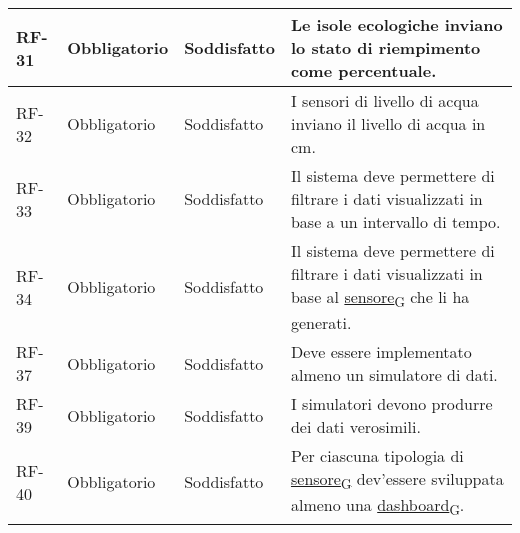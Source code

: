 \begin{longtable}{|>{\centering\arraybackslash}m{}|>{\centering\arraybackslash}m{}|>{\centering\arraybackslash}m{}|>{\centering\arraybackslash}m{}|}
	\\\hline
	RF-31           & Obbligatorio        & Soddisfatto & Le isole ecologiche inviano lo stato di riempimento come percentuale.
	\\\hline
	RF-32           & Obbligatorio        & Soddisfatto & I sensori di livello di acqua inviano il livello di acqua in cm.
	\\\hline
	RF-33           & Obbligatorio        & Soddisfatto & Il sistema deve permettere di filtrare i dati visualizzati in base a un intervallo di tempo.
	\\\hline
	RF-34           & Obbligatorio        & Soddisfatto & Il sistema deve permettere di filtrare i dati visualizzati in base al \href{https://7last.github.io/docs/rtb/documentazione-interna/glossario\#sensore}{sensore\textsubscript{G}} che li ha generati.
	\\\hline
	RF-37           & Obbligatorio        & Soddisfatto & Deve essere implementato almeno un simulatore di dati.
	\\\hline
	RF-39           & Obbligatorio        & Soddisfatto & I simulatori devono produrre dei dati verosimili.
	\\\hline
	RF-40           & Obbligatorio        & Soddisfatto & Per ciascuna tipologia di \href{https://7last.github.io/docs/rtb/documentazione-interna/glossario\#sensore}{sensore\textsubscript{G}} dev'essere sviluppata almeno una \href{https://7last.github.io/docs/rtb/documentazione-interna/glossario\#dashboard}{dashboard\textsubscript{G}}.
	\\\hline

\end{longtable}
